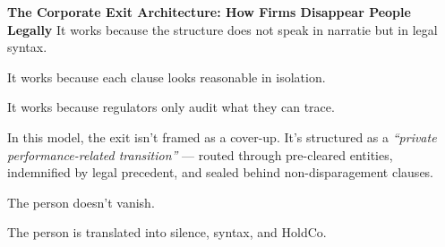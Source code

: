 \begin{HistoricalSidebar}{\textbf{The Corporate Exit Architecture: How Firms Disappear People Legally}}
    It works because the structure does not speak in narratie but in legal syntax.

    \medskip
    
    It works because each clause looks reasonable in isolation.

    \medskip
    
    It works because regulators only audit what they can trace.
    
    \medskip
    
    In this model, the exit isn’t framed as a cover-up. It’s structured as a \textit{“private 
    performance-related transition”} — routed through pre-cleared entities, indemnified by legal 
    precedent, and sealed behind non-disparagement clauses.

    \medskip
    
    The person doesn’t vanish.

    \medskip
    
    The person is translated into silence, syntax, and HoldCo.
    
\end{HistoricalSidebar}
